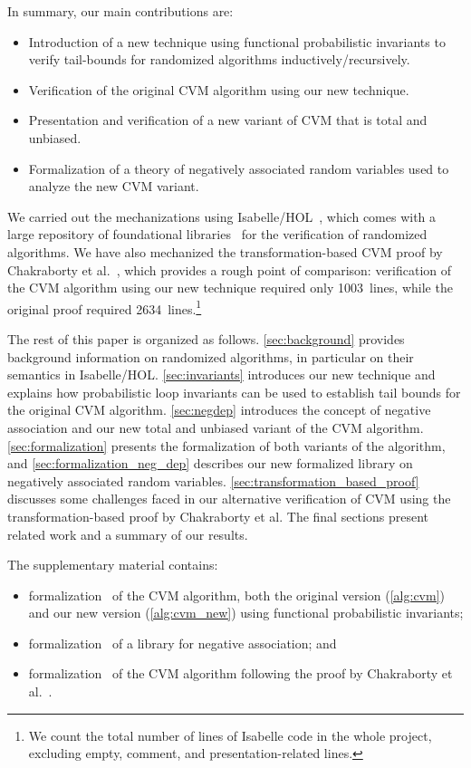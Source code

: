 \documentclass[a4paper,UKenglish,cleveref, autoref, thm-restate]{lipics-v2021}
\newcommand\locnew{1003}
\newcommand\locold{2634}
\begin{document}
In summary, our main contributions are:
\begin{itemize}
\item Introduction of a new technique using functional probabilistic invariants to verify tail-bounds for randomized algorithms inductively/recursively.
\item Verification of the original CVM algorithm using our new technique.
\item Presentation and verification of a new variant of CVM that is total and unbiased.
\item Formalization of a theory of negatively associated random variables used to analyze the new CVM variant.
\end{itemize}

We carried out the mechanizations using Isabelle/HOL~\cite{nipkow2002}, which comes with a large repository of foundational libraries~\cite{afp} for the verification of randomized algorithms.
We have also mechanized the transformation-based CVM proof by Chakraborty et al.~\cite{chakraborty2022,chakraborty2023}, which provides a rough point of comparison:
verification of the CVM algorithm using our new technique required only \locnew~lines, while the original proof required \locold~lines.\footnote{
We count the total number of lines of Isabelle code in the whole project, excluding empty, comment, and presentation-related lines.
}

The rest of this paper is organized as follows.
\cref{sec:background} provides background information on randomized algorithms, in particular on their semantics in Isabelle/HOL.
\cref{sec:invariants} introduces our new technique and explains how probabilistic loop invariants can be used to establish tail bounds for the original CVM algorithm.
\cref{sec:negdep} introduces the concept of negative association and our new total and unbiased variant of the CVM algorithm.
\cref{sec:formalization} presents the formalization of both variants of the algorithm, and \cref{sec:formalization_neg_dep} describes our new formalized library on negatively associated random variables.
\cref{sec:transformation_based_proof} discusses some challenges faced in our alternative verification of CVM using the transformation-based proof by Chakraborty et al.
The final sections present related work and a summary of our results.

The supplementary material contains:
\begin{itemize}
\item formalization~\cite{CVM_Distinct_Elements-AFP} of the CVM algorithm, both the original version (\cref{alg:cvm}) and our new version (\cref{alg:cvm_new}) using functional probabilistic invariants;
\item formalization~\cite{Negative_Association-AFP} of a library for negative association; and
\item formalization~\cite{CVM_Transforms-Github} of the CVM algorithm following the proof by Chakraborty et al.~\cite{chakraborty2022,chakraborty2023}.
\end{itemize}
\end{document}
